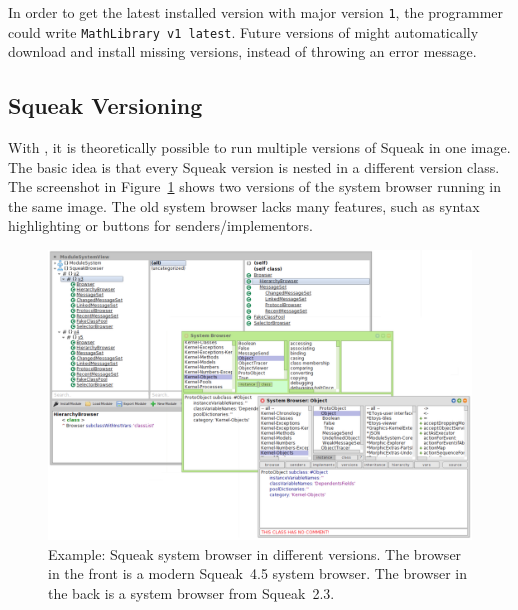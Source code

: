 In order to get the latest installed version with major version \texttt{1}, the programmer could write \texttt{MathLibrary v1 latest}. Future versions of \msname might automatically download and install missing versions, instead of throwing an error message.

\subsection{Squeak Versioning}
With \msname, it is theoretically possible to run multiple versions of Squeak in one image. The basic idea is that every Squeak version is nested in a different version class. The screenshot in Figure~\ref{fig:usecase_browsers} shows two versions of the system browser running in the same image. The old system browser lacks many features, such as syntax highlighting or buttons for senders/implementors.

\begin{figure}[!htp]
\includegraphics[width=\textwidth]{usecase_browsers.png}
\centering
\caption[Example: Squeak system browser in different versions]{Example: Squeak system browser in different versions. The browser in the front is a modern Squeak~4.5 system browser. The browser in the back is a system browser from Squeak~2.3.}
\label{fig:usecase_browsers}
\end{figure}

